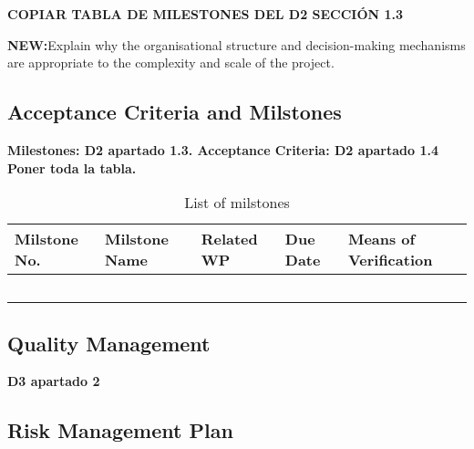 \textbf{COPIAR TABLA DE MILESTONES DEL D2 SECCIÓN 1.3} 


\textbf{NEW:}Explain why the organisational structure and decision-making mechanisms are appropriate to the complexity and scale of the project. 

\subsection{Acceptance Criteria and Milstones}

\textbf{Milestones: D2 apartado 1.3. Acceptance Criteria: D2 apartado 1.4 Poner toda la tabla.}


\begin{longtable}[H]{p{1.9cm} p{3cm} p{2.2cm} p{2cm} l }
	\toprule[2pt]
	
	\textbf{Milstone No.} & \textbf{Milstone Name} & \textbf{Related WP} & \textbf{Due Date} & \textbf{Means of Verification} \\
	
	\midrule[1.5pt] 
	\endhead
	
	 &  &  &  & \vspace{0.2cm} \\
	
	\midrule

	 &  &  &  & \vspace{0.2cm} \\
	
	\midrule
	
	 &  &  &  & \vspace{0.2cm} \\

	\midrule

 	 &  &  &  & \vspace{0.2cm} \\
	
	\bottomrule[2pt]
	
	\caption{List of milstones}
	\label{workpackages}
\end{longtable}

\subsection{Quality Management}

\textbf{D3 apartado 2}

\subsection{Risk Management Plan}

